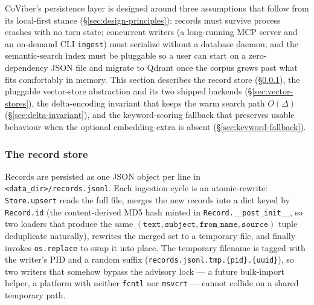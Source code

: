 CoViber's persistence layer is designed around three assumptions that
follow from its local-first stance (\S\ref{sec:design-principles}):
records must survive process crashes with no torn state; concurrent
writers (a long-running MCP server and an on-demand CLI \texttt{ingest})
must serialize without a database daemon; and the semantic-search index
must be pluggable so a user can start on a zero-dependency JSON file and
migrate to Qdrant once the corpus grows past what fits comfortably in
memory. This section describes the record store
(\S\ref{sec:record-store}), the pluggable vector-store abstraction and
its two shipped backends (\S\ref{sec:vector-stores}), the delta-encoding
invariant that keeps the warm search path $O(\Delta)$
(\S\ref{sec:delta-invariant}), and the keyword-scoring fallback that
preserves usable behaviour when the optional embedding extra is absent
(\S\ref{sec:keyword-fallback}).

\subsubsection{The record store}
\label{sec:record-store}

Records are persisted as one JSON object per line in
\texttt{<data\_dir>/records.jsonl}. Each ingestion cycle is an
atomic\hyp{}rewrite: \texttt{Store.upsert} reads the full file, merges
the new records into a dict keyed by \texttt{Record.id}
(the content-derived MD5 hash minted in
\texttt{Record.\_\_post\_init\_\_}, so two loaders that produce the same
$(\texttt{text},\texttt{subject},\texttt{from\_name},\texttt{source})$
tuple deduplicate naturally), rewrites the merged set to a temporary
file, and finally invokes \texttt{os.replace} to swap it into place.
The temporary filename is tagged with the writer's PID and a random
suffix (\texttt{records.jsonl.tmp.\{pid\}.\{uuid\}}), so two writers
that somehow bypass the advisory lock — a future bulk-import helper, a
platform with neither \texttt{fcntl} nor \texttt{msvcrt} — cannot
collide on a shared temporary path.

